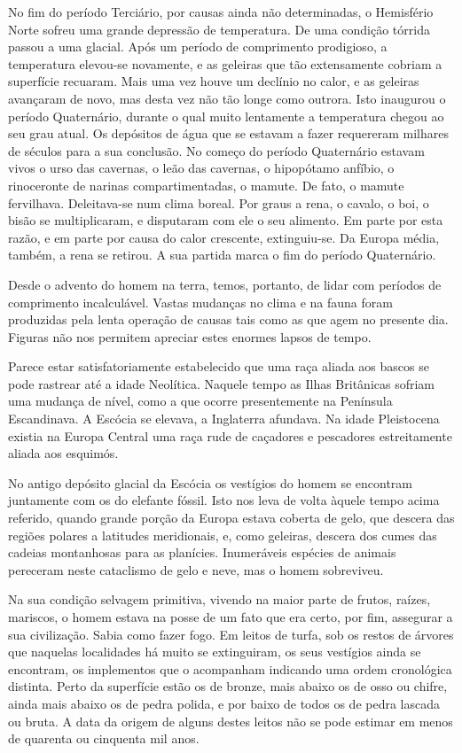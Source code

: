 \documentclass[11pt,a5paper,twoside,openany]{book}
\begin{document}
No fim do período Terciário, por causas ainda não determinadas, o Hemisfério Norte sofreu uma grande depressão de temperatura. De uma condição tórrida passou a uma glacial. Após um período de comprimento prodigioso, a temperatura elevou-se novamente, e as geleiras que tão extensamente cobriam a superfície recuaram. Mais uma vez houve um declínio no calor, e as geleiras avançaram de novo, mas desta vez não tão longe como outrora. Isto inaugurou o período Quaternário, durante o qual muito lentamente a temperatura chegou ao seu grau atual. Os depósitos de água que se estavam a fazer requereram milhares de séculos para a sua conclusão. No começo do período Quaternário estavam vivos o urso das cavernas, o leão das cavernas, o hipopótamo anfíbio, o rinoceronte de narinas compartimentadas, o mamute. De fato, o mamute fervilhava. Deleitava-se num clima boreal. Por graus a rena, o cavalo, o boi, o bisão se multiplicaram, e disputaram com ele o seu alimento. Em parte por esta razão, e em parte por causa do calor crescente, extinguiu-se. Da Europa média, também, a rena se retirou. A sua partida marca o fim do período Quaternário.

Desde o advento do homem na terra, temos, portanto, de lidar com períodos de comprimento incalculável. Vastas mudanças no clima e na fauna foram produzidas pela lenta operação de causas tais como as que agem no presente dia. Figuras não nos permitem apreciar estes enormes lapsos de tempo.

Parece estar satisfatoriamente estabelecido que uma raça aliada aos bascos se pode rastrear até a idade Neolítica. Naquele tempo as Ilhas Britânicas sofriam uma mudança de nível, como a que ocorre presentemente na Península Escandinava. A Escócia se elevava, a Inglaterra afundava. Na idade Pleistocena existia na Europa Central uma raça rude de caçadores e pescadores estreitamente aliada aos esquimós.

No antigo depósito glacial da Escócia os vestígios do homem se encontram juntamente com os do elefante fóssil. Isto nos leva de volta àquele tempo acima referido, quando grande porção da Europa estava coberta de gelo, que descera das regiões polares a latitudes meridionais, e, como geleiras, descera dos cumes das cadeias montanhosas para as planícies. Inumeráveis espécies de animais pereceram neste cataclismo de gelo e neve, mas o homem sobreviveu.

Na sua condição selvagem primitiva, vivendo na maior parte de frutos, raízes, mariscos, o homem estava na posse de um fato que era certo, por fim, assegurar a sua civilização. Sabia como fazer fogo. Em leitos de turfa, sob os restos de árvores que naquelas localidades há muito se extinguiram, os seus vestígios ainda se encontram, os implementos que o acompanham indicando uma ordem cronológica distinta. Perto da superfície estão os de bronze, mais abaixo os de osso ou chifre, ainda mais abaixo os de pedra polida, e por baixo de todos os de pedra lascada ou bruta. A data da origem de alguns destes leitos não se pode estimar em menos de quarenta ou cinquenta mil anos.
\end{document}
